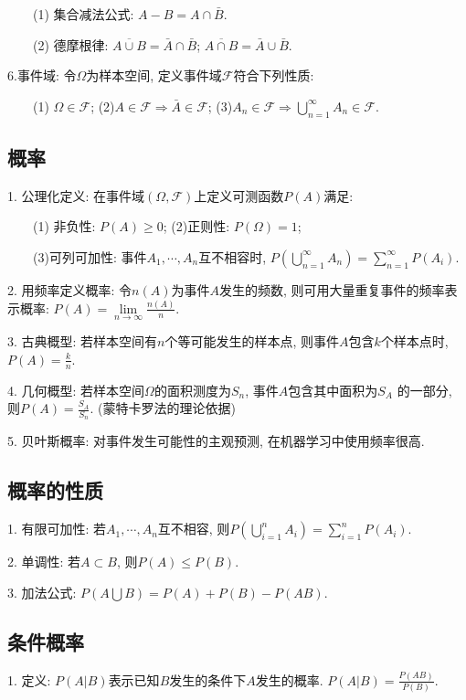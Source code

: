 ~~~~(1) 集合减法公式: $A-B=A \cap \bar{B}$.

~~~~(2) 德摩根律: $\overline{A \cup B}=\bar{A} \cap \bar{B}$; $\overline{A \cap B}=\bar{A} \cup \bar{B}$.

6.事件域: 令$\Omega$为样本空间, 定义事件域$\mathscr{F}$符合下列性质:

~~~~(1) $\Omega \in \mathscr{F}$; (2)$A \in \mathscr{F} \Rightarrow \bar{A} \in \mathscr{F}$; (3)$A_n \in \mathscr{F} \Rightarrow \bigcup\limits_{n=1}^\infty A_n \in \mathscr{F}$.

\subsection{概率}

1. 公理化定义: 在事件域$(\Omega,\mathscr{F})$上定义可测函数$P(A)$满足:

~~~~(1) 非负性: $P(A) \geq 0$; (2)正则性: $P(\Omega)=1$;

~~~~(3)可列可加性: 事件$A_1,\cdots,A_n$互不相容时, $P(\bigcup\limits_{n=1}^\infty A_n)=\sum\limits_{n=1}^\infty P(A_i)$.

2. 用频率定义概率: 令$n(A)$为事件$A$发生的频数, 则可用大量重复事件的频率表示概率: $P(A)=\lim\limits_{n \rightarrow \infty} \frac{n(A)}{n}$.

3. 古典概型: 若样本空间有$n$个等可能发生的样本点, 则事件$A$包含$k$个样本点时, $P(A)=\frac{k}{n}$.

4. 几何概型: 若样本空间$\Omega$的面积测度为$S_n$, 事件$A$包含其中面积为$S_A$ 的一部分, 则$P(A)=\frac{S_A}{S_n}$. (蒙特卡罗法的理论依据)

5. 贝叶斯概率: 对事件发生可能性的主观预测, 在机器学习中使用频率很高.

\subsection{概率的性质}

1. 有限可加性: 若$A_1,\cdots,A_n$互不相容, 则$P(\bigcup\limits_{i=1}^n A_i)=\sum\limits_{i=1}^n P(A_i)$.

2. 单调性: 若$A \subset B$, 则$P(A)\leq P(B)$.

3. 加法公式: $P(A \bigcup B)=P(A)+P(B)-P(AB)$.

\subsection{条件概率}

1. 定义: $P(A|B)$表示已知$B$发生的条件下$A$发生的概率. $P(A|B)=\frac{P(AB)}{P(B)}$.

